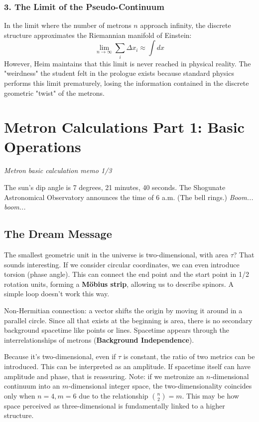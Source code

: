 \documentclass[11pt,a4paper,oneside]{article}
\begin{document}
\subsubsection*{3. The Limit of the Pseudo-Continuum}
In the limit where the number of metrons $n$ approach infinity, the discrete structure approximates the Riemannian manifold of Einstein:
\begin{equation}
    \lim_{n \to \infty} \sum_{i} \Delta x_i \approx \int dx
\end{equation}
However, Heim maintains that this limit is never reached in physical reality. The "weirdness" the student felt in the prologue exists because standard physics performs this limit prematurely, losing the information contained in the discrete geometric "twist" of the metrons. 
\section{Metron Calculations Part 1: Basic Operations}
\textit{Metron basic calculation memo 1/3}

The sun's dip angle is 7 degrees, 21 minutes, 40 seconds. The Shogunate Astronomical Observatory announces the time of 6 a.m. (The bell rings.) \textit{Boom... boom...}

\subsection{The Dream Message}

The smallest geometric unit in the universe is two-dimensional, with area $\tau$? That sounds interesting. If we consider circular coordinates, we can even introduce torsion (phase angle). This can connect the end point and the start point in 1/2 rotation units, forming a \textbf{Möbius strip}, allowing us to describe spinors. A simple loop doesn't work this way.

Non-Hermitian connection: a vector shifts the origin by moving it around in a parallel circle. Since all that exists at the beginning is area, there is no secondary background spacetime like points or lines. Spacetime appears through the interrelationships of metrons (\textbf{Background Independence}).

Because it's two-dimensional, even if $\tau$ is constant, the ratio of two metrics can be introduced. This can be interpreted as an amplitude. If spacetime itself can have amplitude and phase, that is reassuring. Note: if we metronize an $n$-dimensional continuum into an $m$-dimensional integer space, the two-dimensionality coincides only when $n=4, m=6$ due to the relationship $\binom{n}{2} = m$. This may be how space perceived as three-dimensional is fundamentally linked to a higher structure.
\end{document}
